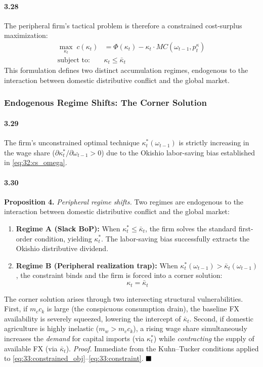 \paragraph{3.28}
The peripheral firm's tactical problem is therefore a
constrained cost-surplus maximization:
\begin{align}
	\max_{\kappa_t}\; c(\kappa_t)
	&= \Phi(\kappa_t) - \kappa_t \cdot MC(\omega_{t-1}, p^\kappa_t)
	\label{eq:33:constrained_obj} \\
	\text{subject to:}\quad & \kappa_t \le \bar{\kappa}_t
	\label{eq:33:constraint}
\end{align}
This formulation defines two distinct accumulation regimes,
endogenous to the interaction between domestic distributive
conflict and the global market.

\subsubsection{Endogenous Regime Shifts: The Corner Solution}

\paragraph{3.29}
The firm's unconstrained optimal technique
$\kappa_t^*(\omega_{t-1})$ is strictly increasing in the wage
share ($\partial \kappa_t^* / \partial \omega_{t-1} > 0$) due
to the Okishio labor-saving bias established in
\eqref{eq:32:cs_omega}.

\paragraph{3.30}
\textbf{Proposition 4.} \textit{Peripheral regime shifts.}
Two regimes are endogenous to the interaction between domestic
distributive conflict and the global market:
\begin{enumerate}
	\item \textbf{Regime A (Slack BoP):} When
	$\kappa_t^* \le \bar{\kappa}_t$, the firm solves the
	standard first-order condition, yielding $\kappa_t^*$. The
	labor-saving bias successfully extracts the Okishio
	distributive dividend.
	\item \textbf{Regime B (Peripheral realization trap):} When
	$\kappa_t^*(\omega_{t-1}) > \bar{\kappa}_t(\omega_{t-1})$,
	the constraint binds and the firm is forced into a corner
	solution:
	\begin{equation}
		\kappa_t = \bar{\kappa}_t
		\label{eq:33:corner}
	\end{equation}
\end{enumerate}
The corner solution arises through two intersecting structural
vulnerabilities. First, if $m_c c_k$ is large (the
conspicuous consumption drain), the baseline FX availability
is severely squeezed, lowering the intercept of
$\bar{\kappa}_t$. Second, if domestic agriculture is highly
inelastic ($m_w > m_c c_k$), a rising wage share
simultaneously increases the \textit{demand} for capital
imports (via $\kappa_t^*$) while \textit{contracting} the
supply of available FX (via $\bar{\kappa}_t$).
\textit{Proof.} Immediate from the Kuhn--Tucker conditions
applied to \eqref{eq:33:constrained_obj}--\eqref{eq:33:constraint}.
$\hfill\blacksquare$

